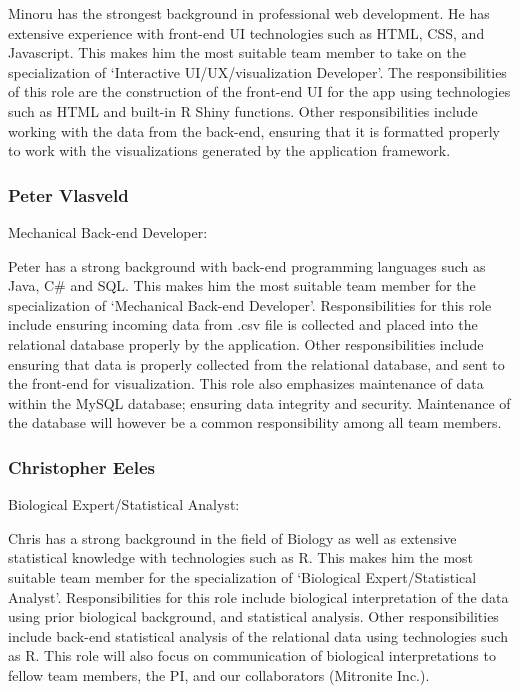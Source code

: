 \documentclass[10pt,twocolumn,letterpaper]{article}
\begin{document}
		Minoru has the strongest background in professional web development.
		He has extensive experience with front-end UI technologies such as HTML, CSS, and Javascript.
		This makes him the most suitable team member to take on the specialization of `Interactive UI/UX/visualization Developer'.
		The responsibilities of this role are the construction of the front-end UI for the app using technologies such as HTML and built-in R Shiny functions.
		Other responsibilities include working with the data from the back-end, ensuring that it is formatted properly to work with the visualizations generated 
		by the application framework. 

                \subsubsection*{Peter Vlasveld}

                Mechanical Back-end Developer:

		Peter has a strong background with back-end programming languages such as Java, C# and SQL.
		This makes him the most suitable team member for the specialization of `Mechanical Back-end Developer'.
		Responsibilities for this role include ensuring incoming data from .csv file is collected and placed into 
		the relational database properly by the application.
		Other responsibilities include ensuring that data is properly collected from the relational database, and sent to the front-end for visualization.
		This role also emphasizes maintenance of data within the MySQL database; ensuring data integrity and security.
		Maintenance of the database will however be a common responsibility among all team members.

                \subsubsection*{Christopher Eeles}

                Biological Expert/Statistical Analyst:
		
		Chris has a strong background in the field of Biology as well as extensive statistical knowledge with technologies such as R.
		This makes him the most suitable team member for the specialization of `Biological Expert/Statistical Analyst'.
		Responsibilities for this role include biological interpretation of the data using prior biological background, and statistical analysis.
		Other responsibilities include back-end statistical analysis of the relational data using technologies such as R.
		This role will also focus on communication of biological interpretations to fellow team members, the PI, and our collaborators (Mitronite Inc.).	
\end{document}
